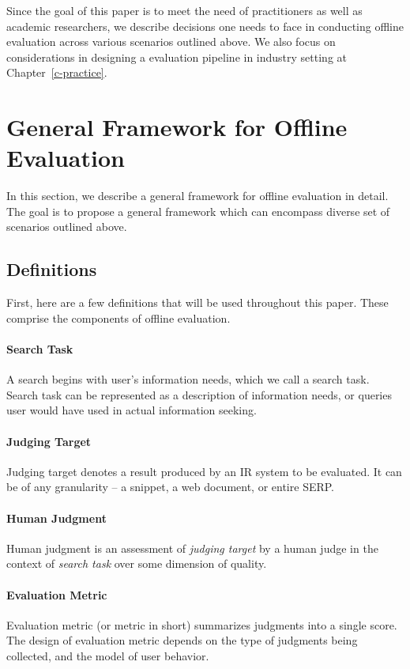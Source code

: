 \documentclass[openany]{now} %
\begin{document}
Since the goal of this paper is to meet the need of practitioners as well as academic researchers, we describe decisions one needs to face in conducting offline evaluation across various scenarios outlined above. We also focus on considerations in designing a evaluation pipeline in industry setting at Chapter~\ref{c-practice}.

\section{General Framework for Offline Evaluation}

In this section, we describe a general framework for offline evaluation in detail. The goal is to propose a general framework which can encompass diverse set of scenarios outlined above. 

\subsection{Definitions}

First, here are a few definitions that will be used throughout this paper. These comprise the components of offline evaluation.

\paragraph{Search Task} A search begins with user's information needs, which we call a search task. Search task can be represented as a description of information needs, or queries user would have used in actual information seeking.

\paragraph{Judging Target} Judging target denotes a result produced by an IR system to be evaluated. It can be of any granularity -- a snippet, a web document, or entire SERP. 
\paragraph{Human Judgment} Human judgment is an assessment of \textit{judging target} by a human judge in the context of \textit{search task} over some dimension of quality. 

\paragraph{Evaluation Metric} Evaluation metric (or metric in short) summarizes judgments into a single score. The design of evaluation metric depends on the type of judgments being collected, and the model of user behavior.
\end{document}
